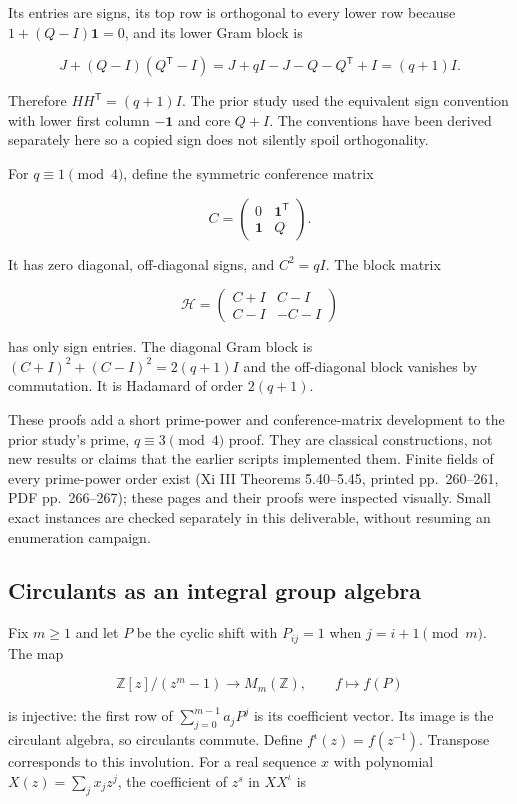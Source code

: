 \documentclass[
  11pt,
]{article}
\begin{document}
Its entries are signs, its top row is orthogonal to every lower row
because \(1+(Q-I)\mathbf1=0\), and its lower Gram block is

\[J+(Q-I)(Q^{\mathsf T}-I)
=J+qI-J-Q-Q^{\mathsf T}+I=(q+1)I.\]

Therefore \(HH^{\mathsf T}=(q+1)I\). The prior study used the equivalent
sign convention with lower first column \(-\mathbf1\) and core \(Q+I\).
The conventions have been derived separately here so a copied sign does
not silently spoil orthogonality.

For \(q\equiv1\pmod4\), define the symmetric conference matrix

\[C=\begin{pmatrix}0&\mathbf1^{\mathsf T}\\\mathbf1&Q\end{pmatrix}.\]

It has zero diagonal, off-diagonal signs, and \(C^2=qI\). The block
matrix

\[\mathcal H=\begin{pmatrix}C+I&C-I\\C-I&-C-I\end{pmatrix}\]

has only sign entries. The diagonal Gram block is
\((C+I)^2+(C-I)^2=2(q+1)I\) and the off-diagonal block vanishes by
commutation. It is Hadamard of order \(2(q+1)\).

These proofs add a short prime-power and conference-matrix development
to the prior study's prime, \(q\equiv3\pmod4\) proof. They are classical
constructions, not new results or claims that the earlier scripts
implemented them. Finite fields of every prime-power order exist (Xi III
Theorems 5.40--5.45, printed pp.~260--261, PDF pp.~266--267); these
pages and their proofs were inspected visually. Small exact instances
are checked separately in this deliverable, without resuming an
enumeration campaign.

\subsection{Circulants as an integral group
algebra}\label{circulants-as-an-integral-group-algebra}

Fix \(m\ge1\) and let \(P\) be the cyclic shift with \(P_{ij}=1\) when
\(j=i+1\pmod m\). The map

\[\mathbb Z[z]/(z^m-1)\longrightarrow M_m(\mathbb Z),
\qquad f\longmapsto f(P)\]

is injective: the first row of \(\sum_{j=0}^{m-1}a_jP^j\) is its
coefficient vector. Its image is the circulant algebra, so circulants
commute. Define \(f^\iota(z)=f(z^{-1})\). Transpose corresponds to this
involution. For a real sequence \(x\) with polynomial
\(X(z)=\sum_jx_jz^j\), the coefficient of \(z^s\) in \(XX^\iota\) is
\end{document}
